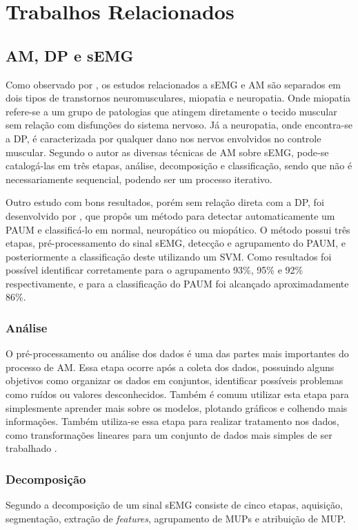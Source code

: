 \chapter{Trabalhos Relacionados}
\label{ch:TrabalhosRelacionados}

\section{AM, DP e sEMG}
Como observado por \cite{yousefi2014characterizing}, os estudos relacionados a sEMG e AM são separados em  dois tipos de transtornos neuromusculares, miopatia e neuropatia. Onde miopatia refere-se a um grupo de patologias que atingem diretamente o tecido muscular sem relação com disfunções do sistema nervoso. Já a neuropatia, onde encontra-se a DP, é caracterizada por qualquer dano nos nervos envolvidos no controle muscular. Segundo o autor  as diversas técnicas de AM sobre sEMG, pode-se catalogá-las em três etapas, análise, decomposição e classificação, sendo que não é necessariamente sequencial, podendo ser um processo iterativo.

Outro estudo com bons resultados, porém sem relação direta com a DP, foi desenvolvido por , que propôs um método para detectar automaticamente um PAUM e classificá-lo em normal, neuropático ou miopático. O método possui três etapas, pré-processamento do sinal sEMG, detecção e agrupamento do PAUM, e posteriormente a classificação deste utilizando um SVM. Como resultados foi possível identificar corretamente para o agrupamento 93\%, 95\% e 92\% respectivamente, e para a classificação do PAUM foi alcançado aproximadamente 86\%. 

\subsection{Análise}
O pré-processamento ou análise dos dados é uma das partes mais importantes do processo de AM. Essa etapa ocorre após a coleta dos dados, possuindo alguns objetivos como organizar os dados em conjuntos, identificar possíveis problemas como ruídos ou valores desconhecidos. Também é comum utilizar esta etapa para simplesmente aprender mais sobre os modelos, plotando gráficos e colhendo mais informações. Também utiliza-se essa etapa para realizar tratamento nos dados, como transformações lineares para um conjunto de dados mais simples de ser trabalhado \cite{batista2003pre}. 

\subsection{Decomposição}
Segundo  a decomposição de um sinal sEMG consiste de cinco etapas, aquisição, segmentação, extração de \textit{features}, agrupamento de MUPs e atribuição de MUP.

